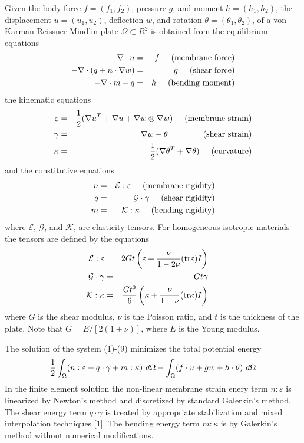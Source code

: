 Given the body force $f=(f_1,f_2)$, pressure $g$, and moment
$h=(h_1,h_2)$, the displacement $u=(u_1,u_2)$, deflection $w$,
and rotation $\theta=(\theta_1,\theta_2)$, of a von Karman-Reissner-Mindlin
plate $\Omega \subset R^2$ is obtained from the equilibrium equations
\begin{eqnarray}
-\Div n & = & f \hskip5truemm (\mathrm{membrane \ force}) \\
-\Div(q + n\cdot \nabla w) & = & g \hskip5truemm (\mathrm{shear \ force}) \\
-\Div m - q & = & h \hskip5truemm (\mathrm{bending \ moment}) 
\end{eqnarray}
the kinematic equations
\begin{eqnarray}
\varepsilon & = & {1\over 2}(\nabla u^T + \nabla u + \nabla w \otimes \nabla w) 
\hskip5truemm (\mathrm{membrane \ strain}) \\
\gamma & = & \nabla w - \theta \hskip15truemm (\mathrm{shear \ strain}) \\
\kappa & = & {1\over 2}(\nabla \theta^T + \nabla \theta) 
\hskip5truemm (\mathrm{curvature}) 
\end{eqnarray}
and the constitutive equations
\begin{eqnarray}
n & = & \mathcal E : \varepsilon \hskip5truemm (\mathrm{membrane \ rigidity}) \\
q & = & \mathcal G \cdot \gamma \hskip5truemm (\mathrm{shear \ rigidity}) \\
m & = & \mathcal K : \kappa \hskip5truemm (\mathrm{bending \  rigidity}) 
\end{eqnarray}
where $\mathcal E$, $\mathcal G$, and $\mathcal K$, are elasticity tensors.
For homogeneous isotropic materials the tensors are defined by the equations
\begin{eqnarray}
\mathcal E : \varepsilon &=& 2Gt \left( \varepsilon 
+ {\nu\over 1-2\nu}(\mathrm{tr}\varepsilon) I \right) \hskip5truemm  \\
\mathcal G \cdot \gamma &=& Gt \gamma \hskip5truemm  \\
\mathcal K : \kappa &=& {Gt^3\over 6}\left( \kappa + {\nu\over 1-\nu}
(\mathrm{tr}\kappa) I\right) \hskip5truemm 
\end{eqnarray}
where $G$ is the shear modulus, $\nu$ is the Poisson ratio, and $t$
is the thickness of the plate. Note that $G=E/[2(1+\nu)]$, where $E$
is the Young modulus.

The solution of the system (1)-(9) minimizes the total potential energy
\begin{equation}
{1\over 2}\int_\Omega (n:\varepsilon + q\cdot\gamma + m:\kappa ) \ d\Omega
- \int_\Omega (f\cdot u + gw + h\cdot\theta) \ d\Omega
\end{equation}
In the finite element solution the non-linear membrane strain enery
term $n:\varepsilon$ is linearized by Newton's method and discretized
by standard Galerkin's method. The shear energy term $q\cdot\gamma$ is
treated by appropriate stabilization and mixed interpolation techniques [1].
The bending energy term $m:\kappa$ is by Galerkin's method without numerical
modifications.

